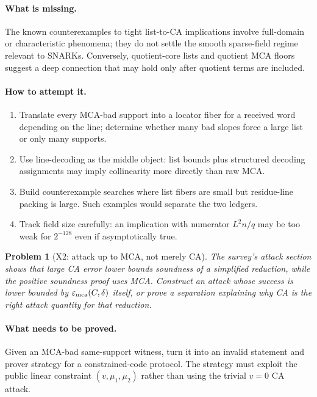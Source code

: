 \documentclass[11pt]{article}
\newtheorem{problem}[theorem]{Problem}
\theoremstyle{definition}
\theoremstyle{remark}
\newcommand{\emca}{\varepsilon_{\rm mca}}
\begin{document}
\paragraph{What is missing.}  The known counterexamples to tight list-to-CA implications involve full-domain or characteristic phenomena; they do not settle the smooth sparse-field regime relevant to SNARKs.  Conversely, quotient-core lists and quotient MCA floors suggest a deep connection that may hold only after quotient terms are included.

\paragraph{How to attempt it.}
\begin{enumerate}[leftmargin=2.2em]
\item Translate every MCA-bad support into a locator fiber for a received word depending on the line; determine whether many bad slopes force a large list or only many supports.
\item Use line-decoding as the middle object: list bounds plus structured decoding assignments may imply collinearity more directly than raw MCA.
\item Build counterexample searches where list fibers are small but residue-line packing is large.  Such examples would separate the two ledgers.
\item Track field size carefully: an implication with numerator $L^2n/q$ may be too weak for $2^{-128}$ even if asymptotically true.
\end{enumerate}

\begin{problem}[X2: attack up to MCA, not merely CA]
\label{prob:X2}
The survey's attack section shows that large CA error lower bounds soundness of a simplified reduction, while the positive soundness proof uses MCA.  Construct an attack whose success is lower bounded by $\emca(C,\delta)$ itself, or prove a separation explaining why CA is the right attack quantity for that reduction.
\end{problem}

\paragraph{What needs to be proved.}  Given an MCA-bad same-support witness, turn it into an invalid statement and prover strategy for a constrained-code protocol.  The strategy must exploit the public linear constraint $(v,\mu_1,\mu_2)$ rather than using the trivial $v=0$ CA attack.
\end{document}
